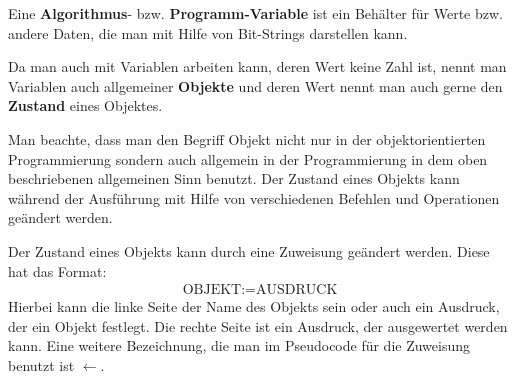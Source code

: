 \begin{defn} 
Eine \textbf{Algorithmus}- bzw. \textbf{Programm-Variable} ist ein Behälter für Werte bzw. andere Daten, die man mit Hilfe von Bit-Strings darstellen kann. 

Da man auch mit Variablen arbeiten kann, deren Wert keine Zahl ist, nennt man Variablen auch allgemeiner \textbf{Objekte} und deren Wert nennt man auch gerne den \textbf{Zustand} eines Objektes. 

Man beachte, dass man den Begriff Objekt nicht nur in der objektorientierten Programmierung sondern auch allgemein in der Programmierung in dem oben beschriebenen allgemeinen Sinn benutzt. Der Zustand eines Objekts kann während der Ausführung mit Hilfe von verschiedenen Befehlen und Operationen geändert werden. 

Der Zustand eines Objekts kann durch eine Zuweisung geändert werden. Diese hat das Format:
\begin{align*}
	\text{OBJEKT} := \text{AUSDRUCK} 
\end{align*} 
Hierbei kann die linke Seite der Name des Objekts sein oder auch ein Ausdruck, der ein Objekt festlegt. Die rechte Seite ist ein Ausdruck, der ausgewertet werden kann. Eine weitere Bezeichnung, die man im Pseudocode für die Zuweisung benutzt ist $\leftarrow$. 
\end{defn} 


